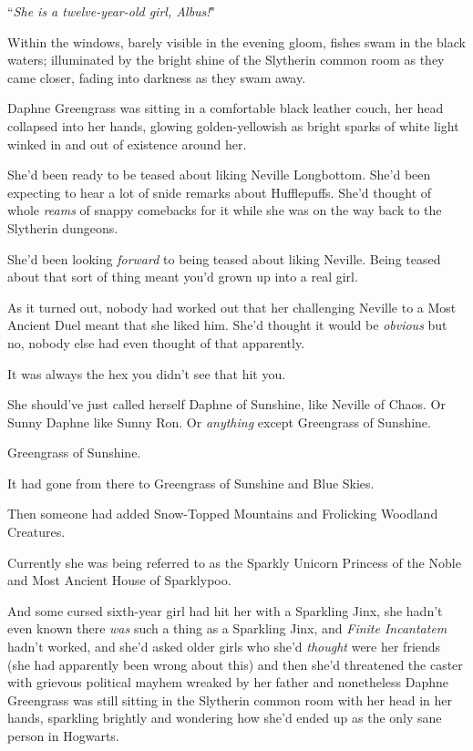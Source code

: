 ``\emph{She is a twelve-year-old girl, Albus!}"


Within the windows, barely visible in the evening gloom, fishes swam in the black waters; illuminated by the bright shine of the Slytherin common room as they came closer, fading into darkness as they swam away.

Daphne Greengrass was sitting in a comfortable black leather couch, her head collapsed into her hands, glowing golden-yellowish as bright sparks of white light winked in and out of existence around her.

She'd been ready to be teased about liking Neville Longbottom. She'd been expecting to hear a lot of snide remarks about Hufflepuffs. She'd thought of whole \emph{reams} of snappy comebacks for it while she was on the way back to the Slytherin dungeons.

She'd been looking \emph{forward} to being teased about liking Neville. Being teased about that sort of thing meant you'd grown up into a real girl.

As it turned out, nobody had worked out that her challenging Neville to a Most Ancient Duel meant that she liked him. She'd thought it would be \emph{obvious} but no, nobody else had even thought of that apparently.

It was always the hex you didn't see that hit you.

She should've just called herself Daphne of Sunshine, like Neville of Chaos. Or Sunny Daphne like Sunny Ron. Or \emph{anything} except Greengrass of Sunshine.

Greengrass of Sunshine.

It had gone from there to Greengrass of Sunshine and Blue Skies.

Then someone had added Snow-Topped Mountains and Frolicking Woodland Creatures.

Currently she was being referred to as the Sparkly Unicorn Princess of the Noble and Most Ancient House of Sparklypoo.

And some cursed sixth-year girl had hit her with a Sparkling Jinx, she hadn't even known there \emph{was} such a thing as a Sparkling Jinx, and \emph{Finite Incantatem} hadn't worked, and she'd asked older girls who she'd \emph{thought} were her friends (she had apparently been wrong about this) and then she'd threatened the caster with grievous political mayhem wreaked by her father and nonetheless Daphne Greengrass was still sitting in the Slytherin common room with her head in her hands, sparkling brightly and wondering how she'd ended up as the only sane person in Hogwarts.

